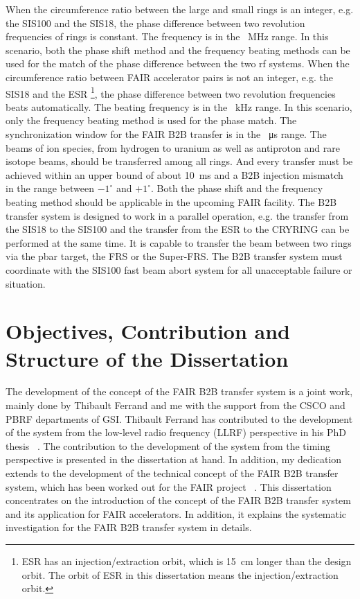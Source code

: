 When the circumference ratio between the large and small rings is an integer, e.g. the SIS100 and the SIS18, the phase difference between two revolution frequencies of rings is constant. The frequency is in the \SI{}{MHz} range. In this scenario, both the phase shift method and the frequency beating methods can be used for the match of the phase difference between the two rf systems. When the circumference ratio between FAIR accelerator pairs is not an integer, e.g. the SIS18 and the ESR \footnote{ESR has an injection/extraction orbit, which is \SI{15}{cm} longer than the design orbit. The orbit of ESR in this dissertation means the injection/extraction orbit.}, the phase difference between two revolution frequencies beats automatically. The beating frequency is in the \SI{}{kHz} range. In this scenario, only the frequency beating method is used for the phase match. The synchronization window for the FAIR B2B transfer is in the \SI{}{\micro\second} range. The beams of ion species, from hydrogen to uranium as well as antiproton and rare isotope beams, should be transferred among all rings. And every transfer must be achieved within an upper bound of about \SI{10}{ms} and a B2B injection mismatch in the range between $-1^\circ$ and $+1^\circ$. Both the phase shift and the frequency beating method should be applicable in the upcoming FAIR facility. The B2B transfer system is designed to work in a parallel operation, e.g. the transfer from the SIS18 to the SIS100 and the transfer from the ESR to the CRYRING can be performed at the same time. It is capable to transfer the beam between two rings via the pbar target, the FRS or the Super-FRS. The B2B transfer system must coordinate with the SIS100 fast beam abort system for all unacceptable failure or situation. 




\section{Objectives, Contribution and Structure of the Dissertation}
The development of the concept of the FAIR B2B transfer system is a joint work, mainly done by Thibault Ferrand and me with the support from the CSCO and PBRF departments of GSI. Thibault Ferrand has contributed to the development of the system from the low-level radio frequency (LLRF) perspective in his PhD thesis ~\cite{ferrand_development_nodate}. The contribution to the development of the system from the timing perspective is presented in the dissertation at hand. In addition, my dedication extends to the development of the technical concept of the FAIR B2B transfer system, which has been worked out for the FAIR project ~\cite{bai_f-tc-c-05_2016}. This dissertation concentrates on the introduction of the concept of the FAIR B2B transfer system and its application for FAIR accelerators. In addition, it explains the systematic investigation for the FAIR B2B transfer system in details. 


